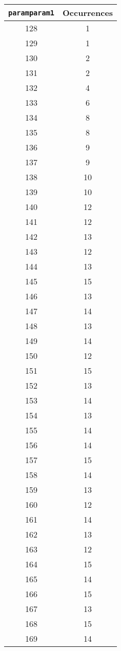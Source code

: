 \documentclass[letterpaper, 12pt]{article}
\begin{document}
\begin{longtable}{|c|c|}
\hline
\textbf{\texttt{paramparam1}} & \textbf{Occurrences} \\
\hline
128 & 1 \\
\hline
129 & 1 \\
\hline
130 & 2 \\
\hline
131 & 2 \\
\hline
132 & 4 \\
\hline
133 & 6 \\
\hline
134 & 8 \\
\hline
135 & 8 \\
\hline
136 & 9 \\
\hline
137 & 9 \\
\hline
138 & 10 \\
\hline
139 & 10 \\
\hline
140 & 12 \\
\hline
141 & 12 \\
\hline
142 & 13 \\
\hline
143 & 12 \\
\hline
144 & 13 \\
\hline
145 & 15 \\
\hline
146 & 13 \\
\hline
147 & 14 \\
\hline
148 & 13 \\
\hline
149 & 14 \\
\hline
150 & 12 \\
\hline
151 & 15 \\
\hline
152 & 13 \\
\hline
153 & 14 \\
\hline
154 & 13 \\
\hline
155 & 14 \\
\hline
156 & 14 \\
\hline
157 & 15 \\
\hline
158 & 14 \\
\hline
159 & 13 \\
\hline
160 & 12 \\
\hline
161 & 14 \\
\hline
162 & 13 \\
\hline
163 & 12 \\
\hline
164 & 15 \\
\hline
165 & 14 \\
\hline
166 & 15 \\
\hline
167 & 13 \\
\hline
168 & 15 \\
\hline
169 & 14 \\

\end{longtable}
\end{document}
